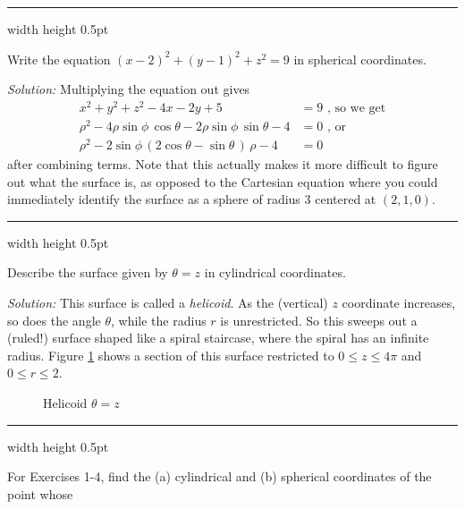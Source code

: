 \vspace{2mm}
\hrule width \textwidth height 0.5pt
\begin{exmp}
 Write the equation $(x - 2)^2 + (y - 1)^2 + z^2 = 9$ in spherical coordinates.\vspace{1mm}
 \par\noindent \emph{Solution:} Multiplying the equation out gives
 \begin{align*}
  x^2 + y^2 + z^2 - 4x - 2y + 5 &= 9 \text{~, so we get}\\
  \rho^2 - 4 \rho \sin \phi \,\cos \theta - 2 \rho \sin \phi \,\sin \theta - 4 &= 0 \text{~,~or}\\
  \rho^2 - 2 \sin \phi \, ( 2 \cos \theta - \sin \theta \, ) \,\rho - 4 &= 0
 \end{align*}
 after combining terms. Note that this actually makes it more difficult to figure out what the surface is,
 as opposed to the Cartesian equation where you could immediately identify the surface as a sphere of radius $3$ centered
 at $(2,1,0)$.
\end{exmp}
\hrule width \textwidth height 0.5pt
\begin{exmp}\label{exmp:helicoid}
 Describe the surface given by $\theta = z$ in cylindrical coordinates.\vspace{1mm}
 \par\noindent \emph{Solution:} This surface is called a \emph{helicoid}. As the (vertical) $z$
 coordinate increases, so does the angle $\theta$, while the radius $r$ is unrestricted. So this sweeps out a (ruled!)
 surface shaped like a spiral staircase, where the spiral has an infinite radius. Figure \ref{fig:helicoid} shows a
 section of this surface restricted to $0 \le z \le 4\pi$ and $0 \le r \le 2$.\vspace{-20mm}
 \begin{figure}[h]
  \begin{center}
   
  \end{center}\vspace{-12mm}
 \caption[]{\quad Helicoid $\theta = z$}
 \label{fig:helicoid}
 \end{figure}
\end{exmp}\vspace{-4mm}
\hrule width \textwidth height 0.5pt
\newpage
\centerline{}\label{ssec1dot7}
\par\noindent For Exercises 1-4, find the (a) cylindrical and (b) spherical coordinates of the point whose
